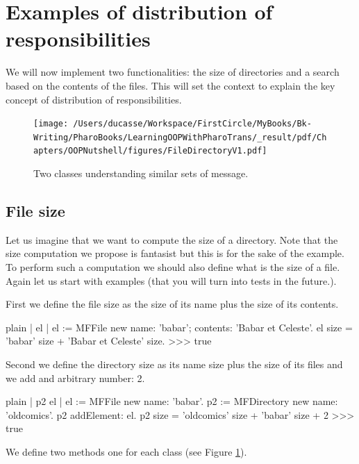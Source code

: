 \documentclass[10pt,twoside,english]{_support/latex/sbabook/sbabook}
\begin{document}
\section{Examples of distribution of responsibilities }
We will now implement two functionalities: the size of directories and a search based on the contents of the files. This will set the context to explain the key concept of distribution of responsibilities.


\begin{figure}

\begin{center}
\texttt{[image: /Users/ducasse/Workspace/FirstCircle/MyBooks/Bk-Writing/PharoBooks/LearningOOPWithPharoTrans/\_result/pdf/Chapters/OOPNutshell/figures/FileDirectoryV1.pdf]}\caption{Two classes understanding similar sets of message.\label{NutFileDirectoryV1}}\end{center}
\end{figure}

\subsection{File size }
Let us imagine that we want to compute the size of a directory. Note that the size computation we propose is fantasist but this is for the sake of the example. To perform such a computation we should also define what is the size of a file. Again let us start with examples (that you will turn into tests in the future.).

First we define the file size as the size of its name plus the size of its contents.

\begin{displaycode}{plain}
| el |
el := MFFile new name: 'babar'; contents: 'Babar et Celeste'.
el size = 'babar' size + 'Babar et Celeste' size.
>>> true
\end{displaycode}

Second we define the directory size as its name size plus the size of its files and we add and arbitrary number: 2. 

\begin{displaycode}{plain}
| p2 el |
el := MFFile new name: 'babar'.
p2 := MFDirectory new name: 'oldcomics'.
p2 addElement: el. 
p2 size = 'oldcomics' size + 'babar' size + 2
>>> true
\end{displaycode}

We define two methods  one for each class (see Figure \ref{NutFileDirectoryV1}).
\end{document}
